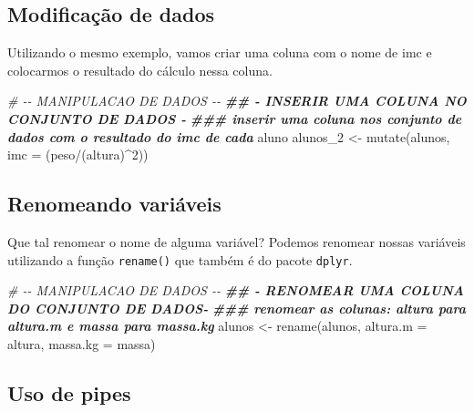\documentclass[
]{book}
\newenvironment{Shaded}{\begin{snugshade}}{\end{snugshade}}
\newcommand{\AttributeTok}[1]{\textcolor[rgb]{0.77,0.63,0.00}{#1}}
\newcommand{\CommentTok}[1]{\textcolor[rgb]{0.56,0.35,0.01}{\textit{#1}}}
\newcommand{\DecValTok}[1]{\textcolor[rgb]{0.00,0.00,0.81}{#1}}
\newcommand{\DocumentationTok}[1]{\textcolor[rgb]{0.56,0.35,0.01}{\textbf{\textit{#1}}}}
\newcommand{\FunctionTok}[1]{\textcolor[rgb]{0.00,0.00,0.00}{#1}}
\newcommand{\NormalTok}[1]{#1}
\newcommand{\OtherTok}[1]{\textcolor[rgb]{0.56,0.35,0.01}{#1}}
\newcommand{\SpecialCharTok}[1]{\textcolor[rgb]{0.00,0.00,0.00}{#1}}
\begin{document}
\hypertarget{modificauxe7uxe3o-de-dados}{%
\subsection{Modificação de dados}\label{modificauxe7uxe3o-de-dados}}

Utilizando o mesmo exemplo, vamos criar uma coluna com o nome de imc e colocarmos o
resultado do cálculo nessa coluna.

\begin{Shaded}
\begin{Highlighting}[]
\CommentTok{\# {-}{-} MANIPULACAO DE DADOS {-}{-}}
\DocumentationTok{\#\# {-} INSERIR UMA COLUNA NO CONJUNTO DE DADOS {-}}
\DocumentationTok{\#\#\# inserir uma coluna nos conjunto de dados com o resultado do imc de cada}
\NormalTok{aluno}
\NormalTok{alunos\_2 }\OtherTok{\textless{}{-}} \FunctionTok{mutate}\NormalTok{(alunos, }\AttributeTok{imc =}\NormalTok{ (peso}\SpecialCharTok{/}\NormalTok{(altura)}\SpecialCharTok{\^{}}\DecValTok{2}\NormalTok{))}
\end{Highlighting}
\end{Shaded}

\hypertarget{renomeando-variuxe1veis}{%
\subsection{Renomeando variáveis}\label{renomeando-variuxe1veis}}

Que tal renomear o nome de alguma variável? Podemos renomear nossas variáveis utilizando a função \texttt{rename()} que também é do pacote \texttt{dplyr}.

\begin{Shaded}
\begin{Highlighting}[]
\CommentTok{\# {-}{-} MANIPULACAO DE DADOS {-}{-}}
\DocumentationTok{\#\# {-} RENOMEAR UMA COLUNA DO CONJUNTO DE DADOS{-}}
\DocumentationTok{\#\#\# renomear as colunas: altura para altura.m e massa para massa.kg}
\NormalTok{alunos }\OtherTok{\textless{}{-}} \FunctionTok{rename}\NormalTok{(alunos,}
                 \AttributeTok{altura.m =}\NormalTok{ altura,}
                 \AttributeTok{massa.kg =}\NormalTok{ massa)}
\end{Highlighting}
\end{Shaded}

\hypertarget{uso-de-pipes}{%
\subsection{Uso de pipes}\label{uso-de-pipes}}
\end{document}
